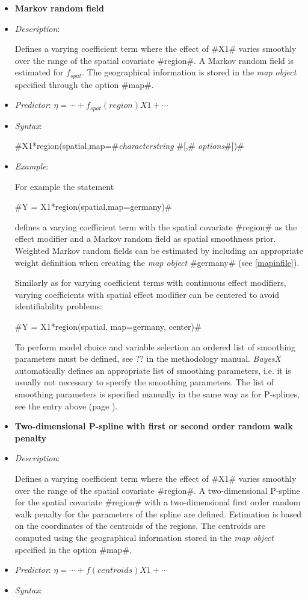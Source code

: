 \begin{itemize}
\item[]{\bf\sffamily Markov random field}

\item[] {\em Description}:

Defines a varying coefficient term where the effect of #X1# varies
smoothly over the range of the spatial covariate #region#. A
Markov random field is estimated for $f_{spat}$. The geographical
information is stored in the {\em map object} specified through the
option #map#.
\item[] {\em Predictor}: $\eta = \cdots + f_{spat}(region)X1 + \cdots$
\item[] {\em Syntax}:

#X1*region(spatial,map=#{\it characterstring} #[,# {\it options}#])#
\item[] {\em Example}:

For example the statement

#Y = X1*region(spatial,map=germany)#

defines a varying coefficient term with the spatial covariate
#region# as the effect modifier and a Markov random field as spatial
smoothness prior. Weighted Markov random fields can be estimated by
including an appropriate weight definition when creating the {\em
map object} #germany# (see \autoref{mapinfile}).

Similarly as for varying coefficient terms with continuous effect
modifiers, varying coefficients with spatial effect modifier can be
centered to avoid identifiability problems:

#Y = X1*region(spatial, map=germany, center)#


To perform model choice and variable selection an ordered list of smoothing parameters must be defined, see ??
in the methodology manual. {\em BayesX} automatically defines an appropriate list of smoothing parameters, i.e. it
is usually not necessary to  specify the smoothing parameters.
The list of smoothing parameters is specified manually in the same way as for P-splines,
see the entry above (page \pageref{psplines_stepwise}).
\item[]{\bf\sffamily Two-dimensional P-spline with first or second order
random walk penalty}

\item[] {\em Description}:

Defines a varying coefficient term where the effect of #X1# varies
smoothly over the range of the spatial covariate #region#.
A two-dimensional P-spline for the spatial covariate
#region# with a two-dimensional first order random walk penalty
for the parameters of the spline are defined. Estimation is based on the
coordinates of the centroids of the regions. The centroids are
computed using the geographical information stored in the {\em map
object} specified in the option #map#.
\item[] {\em Predictor}:
$\eta= \cdots + f(centroids) X1 + \cdots$ \item[] {\em Syntax}:


\end{itemize}

